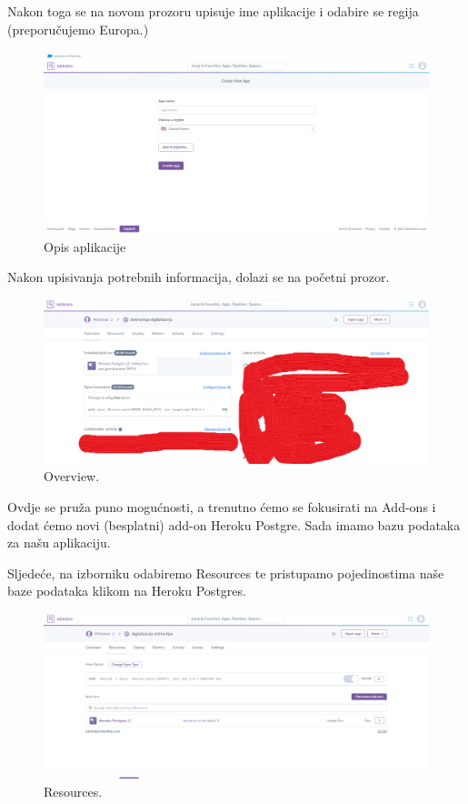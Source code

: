 			 Nakon toga se na novom prozoru upisuje ime aplikacije i odabire se regija (preporučujemo Europa.)
			 
			 \begin{figure}[H]
			 	\includegraphics[scale=0.4]{slike/opis aplikacije.png} 
			 	\centering
			 	\caption{Opis aplikacije}
			 	\label{DS}
			 \end{figure} 
			 
			 Nakon upisivanja potrebnih informacija, dolazi se na početni prozor.
			 \begin{figure}[H]
			 	\includegraphics[scale=0.3]{slike/Overview.png} 
			 	\centering
			 	\caption{ Overview.}
			 	\label{DS}
			 \end{figure}
			 
			 Ovdje se pruža puno mogućnosti, a trenutno ćemo se fokusirati na Add-ons i dodat ćemo novi (besplatni) add-on Heroku Postgre. Sada imamo bazu podataka za našu aplikaciju.
			 
			 Sljedeće, na izborniku odabiremo Resources te pristupamo pojedinostima naše baze podataka klikom na Heroku Postgres.
			 
			 \begin{figure}[H]
			 	\includegraphics[scale=0.4]{slike/Resources.png} 
			 	\centering
			 	\caption{ Resources.}
			 	\label{DS}
			 \end{figure}
		 
